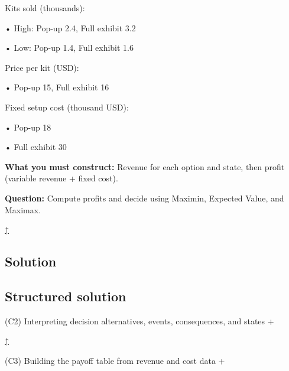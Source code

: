 \documentclass[11pt]{article}
\begin{document}
	
	
	Kits sold (thousands):
	
	
	
	• High: Pop-up 2.4, Full exhibit 3.2
	
	
	
	• Low: Pop-up 1.4, Full exhibit 1.6
	
	
	
	
	
	Price per kit (USD):
	
	
	
	• Pop-up 15, Full exhibit 16
	
	
	
	
	
	Fixed setup cost (thousand USD):
	
	
	
	• Pop-up 18
	
	
	
	• Full exhibit 30
	
	
	
	
	
	
	\textbf{What you must construct:} Revenue for each option and state, then profit (variable revenue + fixed cost).
	
	
	
	
	
	
	\textbf{Question:} Compute profits and decide using Maximin, Expected Value, and Maximax.
	
	\hyperref[problem6-criteria]{↑}
	
	\subsection*{Solution}
	
	\label{problem6-solution}\label{problem6-criteria}
	
	\subsection*{Structured solution}
	
	
	
	
	
	(C2) Interpreting decision alternatives, events, consequences, and states
	+
	
	
	
	
	
	\hyperref[problem6-criteria]{↑}
	
	
	
	
	(C3) Building the payoff table from revenue and cost data
	+
	
\end{document}
